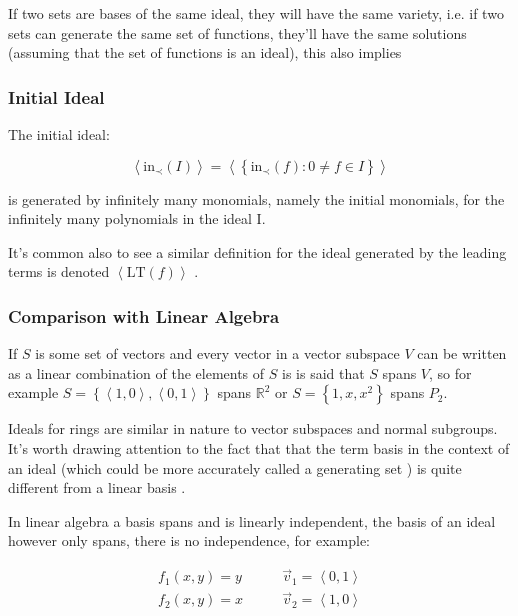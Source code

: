\documentclass[a4paper,11pt,twoside]{article}
\begin{document}
If two sets are bases of the same ideal, they will have the same
variety, i.e. if two sets can generate the same set of functions,
they'll have the same solutions (assuming that the set of
functions is an ideal), this also implies


\subsubsection{Initial Ideal}
\label{sec:org71b87f8}
The initial ideal:

\[\left\langle
  \mathrm{in}_{\prec}\left(I\right)\right\rangle =\left\langle
  \left\{ \mathrm{in}_{\prec}\left(f\right):0\neq f\in I\right\}
  \right\rangle \]

is generated by infinitely many monomials, namely
the initial monomials, for the infinitely many polynomials in the
ideal I. \cite[\S 1.1.5]{hibiGrobnerBasesStatistics2014}

It's common also to see a similar definition for the ideal
generated by the leading terms is denoted \(\left\langle
  \mathrm{LT}\left(f\right)\right\rangle\) \cite[\S 2.5]{coxIdealsVarietiesAlgorithms1997}.

\subsubsection{Comparison with Linear Algebra}
\label{sec:org78345b6}
If \(S\) is some set of vectors and every vector in a vector
subspace \(V\) can be written as a linear combination of the
elements of \(S\) is is said that \(S\) spans \(V\), so for
example \(S=\left\{ \left\langle 1,0\right\rangle ,\left\langle
    0,1\right\rangle \right\}\) spans \(\mathbb{R}^2\) or
\(S=\left\{1, x, x^2\right\}\) spans \(P_2\).

Ideals for rings are similar in nature to vector subspaces and
normal subgroups. It's worth drawing attention to the fact that
that the term basis in the context of an ideal (which could be
more accurately called a generating set
\cite{sturmfelsSolvingSystemsPolynomial2002}) is quite different
from a linear basis \cite[p. 35]{coxIdealsVarietiesAlgorithms1997}.

In linear algebra a basis spans and is linearly independent, the
basis of an ideal however only spans, there is no independence,
for example:

$$\begin{aligned}
  f_{1}\left(x,y\right)=y\quad  \quad & \vec{v}_{1}=\left\langle 0,1\right\rangle \\
  f_{2}\left(x,y\right)=x \quad \quad & \vec{v}_{2}=\left\langle
  1,0\right\rangle \end{aligned}$$    
\end{document}
